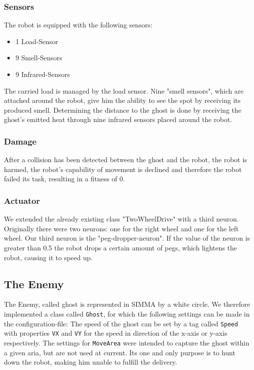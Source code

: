 \documentclass[12pt,fleqn,a4paper]{article}
\begin{document}
\subsubsection{Sensors}
The robot is equipped with the following sensors:
\begin{itemize}
   \item 1 Load-Sensor
   \item 9 Smell-Sensors
   \item 9 Infrared-Sensors
\end{itemize}
The carried load is managed by the load sensor. Nine "smell sensors", which are attached around the robot, give him the ability to see the spot by receiving its produced smell. Determining the distance to the ghost is done by receiving the ghost's emitted heat through nine infrared sensors placed around the robot.

\subsubsection{Damage}
After a collision has been detected between the ghost and the robot, the robot is harmed, the robot's capability of movement is declined and therefore the robot failed its task, resulting in a fitness of 0.

\subsubsection{Actuator}
We extended the already existing class "TwoWheelDrive" with a third neuron. Originally there were two neurons: one for the right wheel and one for the left wheel. Our third neuron is the "peg-dropper-neuron". If the value of the neuron is greater than 0.5 the robot drops a certain amount of pegs, which lightens the robot, causing it to speed up.

\subsection{The Enemy}

The Enemy, called ghost is represented in SIMMA by a white circle. We therefore implemented a class called \texttt{Ghost}, for which the following settings can be made in the configuration-file: The speed of the ghost can be set by a tag called \texttt{Speed} with properties \texttt{VX} and \texttt{VY} for the speed in direction of the x-axis or y-axis respectively. The settings for \texttt{MoveArea} were intended to capture the ghost within a given aria, but are not used at current. Its one and only purpose is to hunt down the robot, making him unable to fulfill the delivery.
\end{document}
